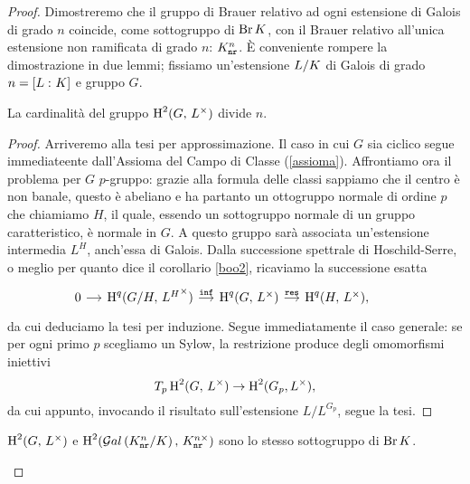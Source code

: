 \begin{proof}
Dimostreremo che il gruppo di Brauer relativo ad ogni estensione di Galois di grado $ n $ coincide, come sottogruppo di $ \operatorname{Br} K $, con il Brauer relativo all'unica estensione non ramificata di grado $ n $: $ K_\mathtt{nr}^n $. È conveniente rompere la dimostrazione in due lemmi;
fissiamo un'estensione $ L/K $ di Galois di grado $ n = [L\,\colon K] $ e gruppo $ G $.

\begin{lemma}\label{Br1}
	La cardinalità del gruppo $ \operatorname{H}^2(G,\, L^\times ) $ divide $ n $.
\end{lemma}

\begin{proof}
	Arriveremo alla tesi per approssimazione. %
	Il caso in cui $ G $ sia ciclico segue immediateente dall'Assioma del Campo di Classe (\ref{assioma}). Affrontiamo ora il problema per $ G $ $ p $-gruppo: grazie alla formula delle classi sappiamo che il centro è non banale, questo è abeliano e ha partanto un ottogruppo normale di ordine $ p $ che chiamiamo $ H $, il quale, essendo un sottogruppo normale di un gruppo caratteristico, è normale in $ G $. A questo gruppo sarà associata un'estensione intermedia $ L^H $, anch'essa di Galois. Dalla successione spettrale di Hoschild-Serre, o meglio per quanto dice il corollario \ref{boo2}, ricaviamo la successione esatta
	\[\begin{tikzcd}[column sep = small]
	0 \rar & \HH^q(G/H, \, {L^H}^\times) \rar["\Inf"]
	& \HH^q(G, \, L^\times) \rar["\Res"]
	& \HH^q(H, \, L^\times),
	\end{tikzcd} \qquad  \]
	da cui deduciamo la tesi per induzione. Segue immediatamente il caso generale: se per ogni primo $ p $ scegliamo un Sylow, la restrizione produce degli omomorfismi iniettivi
	\[ T_p\operatorname{H}^2(G, \, L^\times) \to \operatorname{H}^2(G_p, L^\times), \]
	da cui appunto, invocando il risultato sull'estensione $ L/L^{G_p} $, segue la tesi.
\end{proof}

\begin{lemma}
	$ \operatorname{H}^2(G,\, L^\times ) $ e $ \operatorname{H}^2(\mathcal{G}al\left( K_\mathtt{nr}^n/K \right),\, K_\mathtt{nr}^{n\times}) $ sono lo stesso sottogruppo di $ \operatorname{Br} K $.
\end{lemma}


\end{proof}
